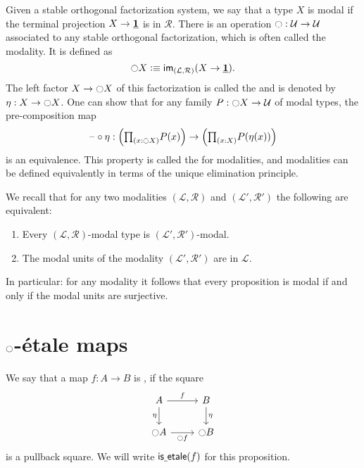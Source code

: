 \documentclass[9pt,twosided]{amsart}
\begin{document}
Given a stable orthogonal factorization system, we say that a type $X$ is modal if the terminal projection $X\to \underline{\mathbf{1}}$ is in $\mathcal{R}$. 
There is an operation ${\ocircle}:\mathcal{U}\to\mathcal{U}$ associated to any stable orthogonal factorization, which is often called the modality. It is defined as
\begin{equation*}
{\ensuremath{\ocircle}} X \vcentcolon\equiv \mathsf{im}_{(\mathcal{L},\mathcal{R})}(X\to \underline{\mathbf{1}}).
\end{equation*}
The left factor $X \to {\ensuremath{\ocircle}} X$ of this factorization is called the  and is denoted by $\eta:X\to {\ensuremath{\ocircle}} X$. One can show that for any family $P:{\ocircle} X \to \mathcal{U}$ of modal types, the pre-composition map
\begin{equation*}
\blank\circ \eta : \Big(\prd{x:\modal X}P(x)\Big)\to \Big(\prd{x:X}P(\eta(x))\Big)
\end{equation*}
is an equivalence. This property is called the  for modalities, and modalities can be defined equivalently in terms of the unique elimination principle.

We recall that for any two modalities $(\mathcal{L},\mathcal{R})$ and $(\mathcal{L}',\mathcal{R}')$ the following are equivalent:
\begin{enumerate}
\item Every $(\mathcal{L},\mathcal{R})$-modal type is $(\mathcal{L}',\mathcal{R}')$-modal.
\item The modal units of the modality $(\mathcal{L}',\mathcal{R}')$ are in $\mathcal{L}$.
\end{enumerate}
In particular: for any modality it follows that every proposition is modal if and only if the modal units are surjective.

\section{\texorpdfstring{${\ocircle}$}{○}-\'etale maps}

\begin{defn}
We say that a map $f:A\to B$ is , if the square
\begin{equation*}
\begin{tikzcd}
A \arrow[r,"f"] \arrow[d,swap,"\eta"] & B \arrow[d,"\eta"] \\
\modal A \arrow[r,swap,"\modal f"] & \modal B
\end{tikzcd}
\end{equation*}
is a pullback square. We will write $\mathsf{is\underline{\ }{}etale}(f)$ for this proposition.
\end{defn}
\end{document}
